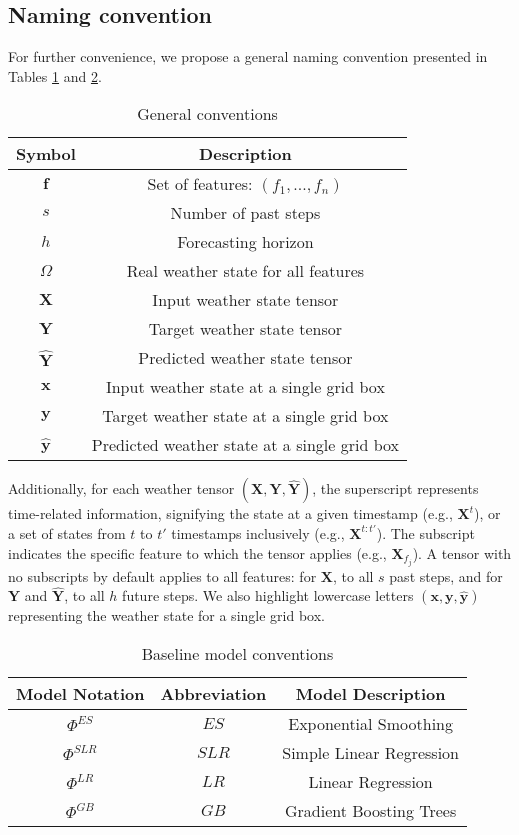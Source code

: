 \subsection{Naming convention}
 For further convenience, we propose a general naming convention presented in Tables \ref{tab:name_conv} and \ref{tab:model_conv}. 
 \begin{table}[!ht]
    \centering
     \begin{tabular}{|c|c|}
        \hline
        Symbol & Description \\
        \hline
        $\mathbf{f}$ & Set of features: $(f_1,..., f_n)$ \\
        $s$ & Number of past steps \\
        $h$ & Forecasting horizon \\
        $\Omega$ & Real weather state for all features \\
        $\mathbf{X}$ & Input weather state tensor  \\
        $\mathbf{Y}$ & Target weather state tensor  \\
        $\hat{\mathbf{Y}}$ & Predicted weather state tensor \\
        $\mathbf{x}$ & Input weather state at a single grid box \\
        $\mathbf{y}$ & Target weather state at a single grid box \\
        $\hat{\mathbf{y}}$ & Predicted weather state at a single grid box \\
        \hline
    \end{tabular}
    \caption{General conventions}
    \label{tab:name_conv}
 \end{table}

Additionally, for each weather tensor $(\mathbf{X}, \mathbf{Y}, \hat{\mathbf{Y}})$, the superscript represents time-related information, signifying the state at a given timestamp (e.g., $\mathbf{X}^t$), or a set of states from $t$ to $t'$ timestamps inclusively (e.g., $\mathbf{X}^{t:t'}$). The subscript indicates the specific feature to which the tensor applies (e.g., $\mathbf{X}_{f_j}$). A tensor with no subscripts by default applies to all features: for $\mathbf{X}$, to all $s$ past steps, and for $\mathbf{Y}$ and $\hat{\mathbf{Y}}$, to all $h$ future steps. We also highlight lowercase letters $(\mathbf{x},\mathbf{y},\hat{\mathbf{y}})$ representing the weather state for a single grid box.
 
\begin{table}[!ht]
    \centering
    \begin{tabular}{|c|c|c|}
        \hline
        Model Notation & Abbreviation & Model Description \\
        \hline
        $\Phi^{ES}$  & $ES$ & Exponential Smoothing \\
        $\Phi^{SLR}$ & $SLR$ & Simple Linear Regression \\
        $\Phi^{LR}$  & $LR$ & Linear Regression \\
        $\Phi^{GB}$ & $GB$ & Gradient Boosting Trees \\
        \hline
    \end{tabular}
\caption{Baseline model conventions}
\label{tab:model_conv}
\end{table}
 
